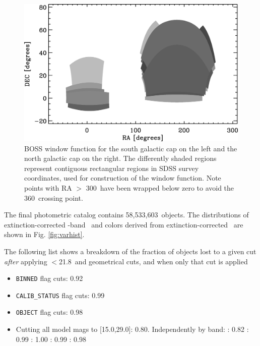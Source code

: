 \documentclass[preprint]{aastex}
\newcommand{\rmax}{21.8}
\newcommand{\nphoto}{58,533,603}
\begin{document}
\begin{figure}[t] \centering
 \centering 
 \includegraphics[scale=0.6]{figures/boss-poly-coverage.eps}

 \caption{BOSS window function for the south galactic cap on the left and the
 north galactic cap on the right.  The differently shaded regions represent
 contiguous rectangular regions in SDSS survey coordinates, used for
 construction of the window function.  Note points with RA $>$ 300\arcdeg\ have
 been wrapped below zero to avoid the 360\arcdeg\ crossing point.}
 \label{fig:footprint}

\end{figure}

The final photometric catalog contains \nphoto\ objects.  The distributions of
extinction-corrected \rmag-band \cmodelmag\ and colors derived from
extinction-corrected \modelmag\ are shown in Fig. \ref{fig:varhist}.

The following list shows a breakdown of the fraction of objects lost
to a given cut {\it after} applying \rmag$ < $\rmax\ and geometrical
cuts, and when only that cut is applied

\begin{itemize}
    \item \texttt{BINNED} flag cuts: 0.92
    \item \texttt{CALIB\_STATUS} flag cuts: 0.99
    \item \texttt{OBJECT} flag cuts: 0.98
    \item Cutting all model mags to [15.0,29.0]: 0.80. Independently by band:
    \umag: 0.82 \gmag: 0.99 \rmag: 1.00 \imag: 0.99 \zmag: 0.98

\end{itemize}
\end{document}
